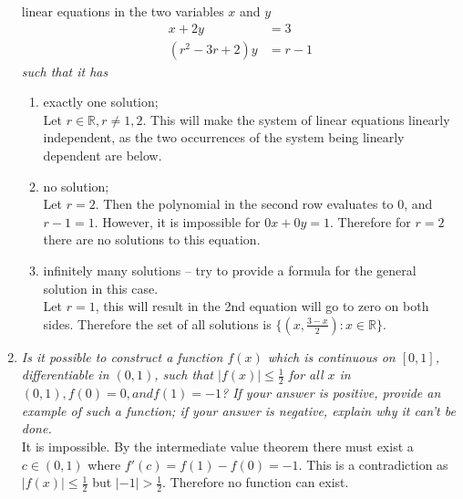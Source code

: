 \documentclass[12pt, letterpaper]{article}
\newcommand{\R}{\mathbb{R}}
\begin{document}
\begin{enumerate}
{linear equations in the two variables $x$ and $y$	
\begin{align*}
	x + 2y &= 3\\
	(r^2 - 3r +2)y &= r-1
\end{align*}  } \textit{such that it has }
	\begin{enumerate}
		\item exactly one solution;\\
		Let $r \in \R, r \neq 1,2$.  This will make the system of linear equations linearly independent, as the two occurrences of the system being linearly dependent are below.  
		\item no solution;\\  
		Let $r=2$.  Then the polynomial in the second row evaluates to $0$, and $r-1=1$.  However, it is impossible for $0x+0y=1.$  Therefore for $r=2$ there are no solutions to this equation.  
		\item infinitely many solutions -- try to provide a formula for the general solution in this case.\\
		Let $r=1$, this will result in the 2nd equation will go to zero on both sides.  Therefore the set of all solutions is $\{(x,\frac{3-x}{2}):x \in \R \}$.
	\end{enumerate}
	\item \textit{Is it possible to construct a function $f(x)$ which is continuous on $[0,1]$, differentiable in $(0,1)$, such that $|f(x)| \leq \frac{1}{2}$ for all $x$ in $(0,1),f(0) = 0, and f(1) = -1$?  If your answer is positive, provide an example of such a function;
if your answer is negative, explain why it can't be done. }\\
It is impossible.  By the intermediate value theorem there must exist a $c \in (0,1)$ where $f'(c) = f(1)-f(0) = -1.$  This is a contradiction as $|f(x)| \leq \frac{1}{2}$ but $|-1| > \frac{1}{2}.$  Therefore no function can exist.
\end{enumerate}
\end{document}
